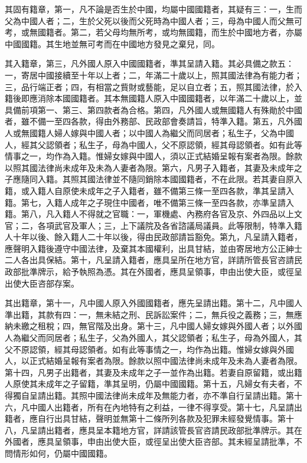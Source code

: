 \begin{pinyinscope}
其固有籍章，第一，凡不論是否生於中國，均屬中國國籍者，其疑有三：一，生而父為中國人者；二，生於父死以後而父死時為中國人者；三，母為中國人而父無可考，或無國籍者。第二，若父母均無所考，或均無國籍，而生於中國地方者，亦屬中國國籍。其生地並無可考而在中國地方發見之棄兒，同。

其入籍章，第三，凡外國人原入中國國籍者，準其呈請入籍。其必具備之款五：一，寄居中國接續至十年以上者；二，年滿二十歲以上，照其國法律為有能力者；三，品行端正者；四，有相當之貲財或藝能，足以自立者；五，照其國法律，於入籍後即應消除本國國籍者。其本無國籍人原入中國國籍者，以年滿二十歲以上，並具備前項第一、第三、第四款者為合格。第四，凡外國人或無國籍人有殊勛於中國者，雖不備一至四各款，得由外務部、民政部會奏請旨，特準入籍。第五，凡外國人或無國籍人婦人嫁與中國人者；以中國人為繼父而同居者；私生子，父為中國人，經其父認領者；私生子，母為中國人，父不原認領，經其母認領者。如有此等情事之一，均作為入籍。惟婦女嫁與中國人，須以正式結婚呈報有案者為限。餘款以照其國法律尚未成年及未為人妻者為限。第六，凡男子入籍者，其妻及未成年之子應隨同入籍。其照其國法律並不隨同銷除本國國籍者，不在此限。若其妻自原入籍，或入籍人自原使未成年之子入籍者，雖不備第三條一至四各款，準其呈請入籍。第七，入籍人成年之子現住中國者，唯不備第三條一至四各款，亦準呈請入籍。第八，凡入籍人不得就之官職：一，軍機處、內務府各官及京、外四品以上文官；二，各項武官及軍人；三，上下議院及各省諮議局議員。此等限制，特準入籍人十年以後、餘入籍人二十年以後，得由民政部請旨豁免。第九，凡呈請入籍者，應聲明入籍後遵守中國法律，及棄其本國權利，出具甘結，並由寄居地方公正紳士二人各出具保結。第十，凡呈請入籍者，應具呈所在地方官，詳請所管長官咨請民政部批準牌示，給予執照為憑。其在外國者，應具呈領事，申由出使大臣，或徑呈出使大臣咨部存案。

其出籍章，第十一，凡中國人原入外國國籍者，應先呈請出籍。第十二，凡中國人準出籍，其款有四：一，無未結之刑、民訴訟案件；二，無兵役之義務；三，無應納未繳之租稅；四，無官階及出身。第十三，凡中國人婦女嫁與外國人者；以外國人為繼父而同居者；私生子，父為外國人，其父認領者；私生子，母為外國人，其父不原認領，經其母認領者。如有此等事情之一，均作為出籍。惟婦女嫁與外國人，以正式結婚呈報有案者為限。餘款以照中國法律尚未成年及未為人妻者為限。第十四，凡男子出籍者，其妻及未成年之子一並作為出籍。若妻自原留籍，或出籍人原使其未成年之子留籍，準其呈明，仍屬中國國籍。第十五，凡婦女有夫者，不得獨自呈請出籍。其照中國法律尚未成年及無能力者，亦不準自行呈請出籍。第十六，凡中國人出籍者，所有在內地特有之利益，一律不得享受。第十七，凡呈請出籍者，應自行出具甘結，聲明並無第十二條所列各款及犯罪未經發覺情事。第十八，凡呈請出籍者，應具呈本籍地方官，詳請該管長官咨請民政部批準牌示。其在外國者，應具呈領事，申由出使大臣，或徑呈出使大臣咨部。其未經呈請批準，不問情形如何，仍屬中國國籍。


\end{pinyinscope}
